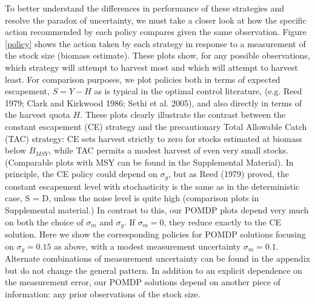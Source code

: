 \documentclass[3p]{elsarticle} %
\begin{document}
To better understand the differences in performance of these strategies
and resolve the paradox of uncertainty, we must take a closer look at
how the specific action recommended by each policy compares given the
same observation. Figure \ref{policy} shows the action taken by each
strategy in response to a measurement of the stock size (biomass
estimate). These plots show, for any possible observations, which
strategy will attempt to harvest most and which will attempt to harvest
least. For comparison purposes, we plot policies both in terms of
expected escapement, \(S = Y - H\) as is typical in the optimal control
literature, (e.g. Reed 1979; Clark and Kirkwood 1986; Sethi et al.
2005), and also directly in terms of the harvest quota \(H\). These
plots clearly illustrate the contrast between the constant escapement
(CE) strategy and the precautionary Total Allowable Catch (TAC)
strategy: CE sets harvest strictly to zero for stocks estimated at
biomass below \(B_{MSY}\), while TAC permits a modest harvest of even
very small stocks. (Comparable plots with MSY can be found in the
Supplemental Material). In principle, the CE policy could depend on
\(\sigma_g\), but as Reed (1979) proved, the constant escapement level
with stochasticity is the same as in the deterministic case, S = D,
unless the noise level is quite high (comparison plots in Supplemental
material.) In contrast to this, our POMDP plots depend very much on both
the choice of \(\sigma_m\) and \(\sigma_g\). If \(\sigma_m = 0\), they
reduce exactly to the CE solution. Here we show the corresponding
policies for POMDP solutions focusing on \(\sigma_g = 0.15\) as above,
with a modest measurement uncertainty \(\sigma_m = 0.1\). Alternate
combinations of measurement uncertainty can be found in the appendix but
do not change the general pattern. In addition to an explicit dependence
on the measurement error, our POMDP solutions depend on another piece of
information: any prior observations of the stock size.
\end{document}
